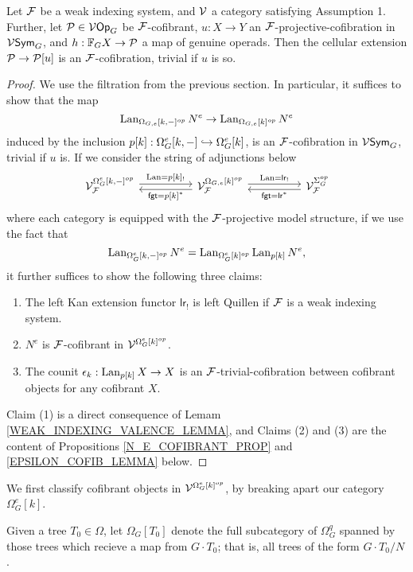 \documentclass[a4paper,10pt]{article}%
\begin{document}
\begin{theorem}
  \label{CELLULAR_EXTENSION_COFIBRATION_THEOREM}
  Let $\F$ be a weak indexing system, and $\V$ a category satisfying Assumption 1. Further, let $\P \in \V\Op_G$ be $\F$-cofibrant, $u: X \to Y$ an $\F$-projective-cofibration in $\V\Sym_G$, and $h: \mathbb F_G X \to \P$ a map of genuine operads. Then the cellular extension $\P \to \P[u]$ is an $\F$-cofibration, trivial if $u$ is so.
\end{theorem}
\begin{proof}
  We use the filtration from the previous section. In particular, it suffices to show that the map
\[
\Lan_{\Omega_{G,e}[k,-]^{op}}N^e \to \Lan_{\Omega_{G,e}[k]^{op}}N^e
\]
induced by the inclusion $p[k]: \Omega_G^e[k,-]\into \Omega_G^e[k]$, is an $\F$-cofibration in $\V\Sym_G$, trivial if $u$ is. If we consider the string of adjunctions below
\[
\begin{tikzcd}
  \V^{\Omega_G^e[k,-]^{op}}_\F \arrow[rr, shift left, "{\Lan = p[k]_!}"] && \V^{\Omega_{G,e}[k]^{op}}_\F \arrow[ll, shift left, "{\mathsf{fgt} = p[k]^*}"] \arrow[rr, shift left, "\Lan = \mathsf{lr}_!"] && \V^{\Sigma_G^{op}}_\F \arrow[ll, shift left, "\mathsf{fgt} = \mathsf{lr}^*"]
\end{tikzcd}
\]
where each category is equipped with the $\F$-projective model structure, if we use the fact that
\[
\Lan_{\Omega_G^e[k,-]^{op}}N^e = \Lan_{\Omega_G^e[k]^{op}}\Lan_{p[k]}N^e,
\]
it further suffices to show the following three claims:
\begin{enumerate}
\item The left Kan extension functor $\mathsf{lr}_!$ is left Quillen if $\F$ is a weak indexing system.
\item $N^e$ is $\F$-cofibrant in $\V^{\Omega_G^e[k]^{op}}$.
\item The counit $\epsilon_k: \Lan_{p[k]}X \to X$ is an $\F$-trivial-cofibration between cofibrant objects for any cofibrant $X$.
\end{enumerate}
Claim (1) is a direct consequence of Lemam \ref{WEAK_INDEXING_VALENCE_LEMMA}, and Claims (2) and (3) are the content of Propositions \ref{N_E_COFIBRANT_PROP} and \ref{EPSILON_COFIB_LEMMA} below.
\end{proof}


We first classify cofibrant objects in $\V^{\Omega_G^e[k]^{op}}$, by breaking apart our category $\Omega_G^e[k]$. 

\begin{definition}
  Given a tree $T_0 \in \Omega$, let $\Omega_G[T_0]$ denote the full subcategory of $\Omega_G^q$ spanned by those trees which recieve a map from $G\cdot T_0$; that is, all trees of the form $G\cdot T_0/N$.
\end{definition}
\end{document}
